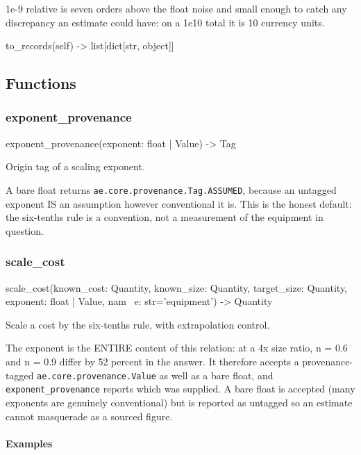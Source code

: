 \documentclass[10pt,a4paper,twoside]{report}
\begin{document}
1e-9 relative is seven orders above the float noise and small enough to catch any discrepancy an estimate could have: on a 1e10 total it is 10 currency units.

\begin{verbatimsmall}
to_records(self) -> list[dict[str, object]]
\end{verbatimsmall}

\subsection*{Functions}

\subsubsection*{exponent\_provenance}

\begin{verbatimsmall}
exponent_provenance(exponent: float | Value) -> Tag
\end{verbatimsmall}

Origin tag of a scaling exponent.

A bare float returns \texttt{ae.core.provenance.Tag.ASSUMED}, because an untagged exponent IS an assumption however conventional it is. This is the honest default: the six-tenths rule is a convention, not a measurement of the equipment in question.

\subsubsection*{scale\_cost}

\begin{verbatimsmall}
scale_cost(known_cost: Quantity, known_size: Quantity, target_size: Quantity, exponent: float | Value, nam
    \ e: str='equipment') -> Quantity
\end{verbatimsmall}

Scale a cost by the six-tenths rule, with extrapolation control.

The exponent is the ENTIRE content of this relation: at a 4x size ratio, n = 0.6 and n = 0.9 differ by 52 percent in the answer. It therefore accepts a provenance-tagged \texttt{ae.core.provenance.Value} as well as a bare float, and \texttt{exponent\_provenance} reports which was supplied. A bare float is accepted (many exponents are genuinely conventional) but is reported as untagged so an estimate cannot masquerade as a sourced figure.

\paragraph*{Examples}
\end{document}
